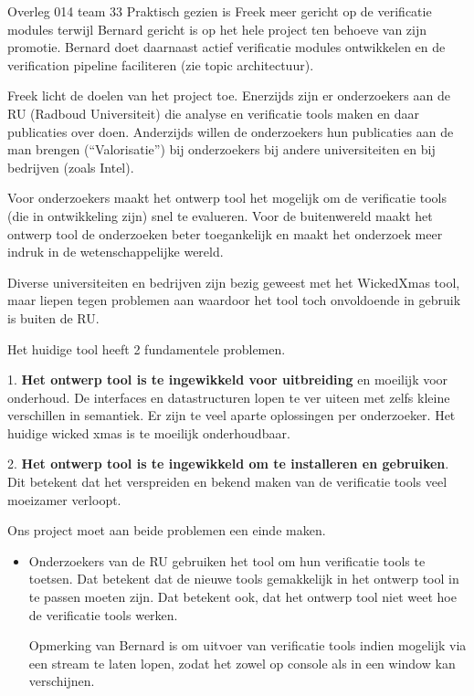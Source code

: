 \documentclass[a4paper,final]{article}
\begin{document}
\begin{Minutes}{Overleg 014 team 33}
Praktisch gezien is Freek meer gericht op de verificatie modules terwijl
Bernard gericht is op het hele project ten behoeve van zijn promotie. Bernard
doet daarnaast actief verificatie modules ontwikkelen en de verification pipeline
faciliteren (zie topic architectuur).

 Freek licht de doelen van het project toe. Enerzijds
zijn er onderzoekers aan de RU (Radboud Universiteit) die analyse en
verificatie tools maken en daar publicaties over doen.  Anderzijds willen de
onderzoekers hun publicaties aan de man brengen (``Valorisatie'') bij
onderzoekers bij andere universiteiten en bij bedrijven (zoals Intel). 

Voor onderzoekers maakt het ontwerp tool het mogelijk om de verificatie tools
(die in ontwikkeling zijn) snel te evalueren. Voor de buitenwereld
maakt het ontwerp tool de onderzoeken beter toegankelijk en 
maakt het onderzoek meer indruk in de wetenschappelijke wereld. 

Diverse universiteiten en bedrijven zijn bezig geweest met het WickedXmas tool, maar 
liepen tegen problemen aan waardoor het tool toch onvoldoende in gebruik is buiten de 
RU.


Het huidige tool heeft 2 fundamentele problemen. 

1. {\bf Het ontwerp tool is te ingewikkeld voor uitbreiding} en moeilijk voor
onderhoud. De interfaces en datastructuren lopen te ver uiteen met zelfs kleine
verschillen in semantiek. Er zijn te veel aparte oplossingen per onderzoeker.
Het huidige wicked xmas is te moeilijk onderhoudbaar.

2. {\bf Het ontwerp tool is te ingewikkeld om te installeren en gebruiken}. Dit
betekent dat het verspreiden en bekend maken van de verificatie tools veel
moeizamer verloopt.

Ons project moet aan beide problemen een einde maken.


\begin{itemize}

	\item Onderzoekers van de RU gebruiken het tool om hun verificatie tools te
		toetsen. Dat betekent dat de nieuwe tools gemakkelijk in het ontwerp
		tool in te passen moeten zijn. Dat betekent ook, dat het ontwerp tool
		niet weet hoe de verificatie tools werken.

		Opmerking van Bernard is om uitvoer van verificatie tools indien
		mogelijk via een stream te laten lopen, zodat het zowel op console als
		in een window kan verschijnen.


\end{itemize}
\end{Minutes}
\end{document}

